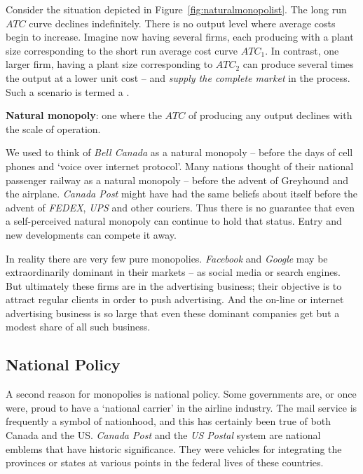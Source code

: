 Consider the situation depicted in Figure~\ref{fig:naturalmonopolist}. The long run $ATC$ curve declines indefinitely. There is no output level where average costs begin to increase. Imagine now having several firms, each producing with a plant size corresponding to the short run average cost curve $ATC_1$. In contrast, one larger firm, having a plant size corresponding to $ATC_2$ can produce several times the output at a lower unit cost -- and \textit{supply the complete market} in the process. Such a scenario is termed a .



\begin{DefBox}
\textbf{Natural monopoly}: one where the $ATC$ of producing any output declines with the scale of operation.
\end{DefBox}

We used to think of \textit{Bell Canada} as a natural monopoly -- before the days of cell phones and `voice over internet protocol'. Many nations thought of their national passenger railway as a natural monopoly -- before the advent of Greyhound and the airplane. \textit{Canada Post} might have had the same beliefs about itself before the advent of \textit{FEDEX}, \textit{UPS} and other couriers. Thus there is no guarantee that even a self-perceived natural monopoly can continue to hold that status. Entry and new developments can compete it away.

In reality there are very few pure monopolies. \textit{Facebook} and \textit{Google} may be extraordinarily dominant in their markets -- as social media or search engines. But ultimately these firms are in the advertising business; their objective is to attract regular clients in order to push advertising. And the on-line or internet advertising business is so large that even these dominant companies get but a modest share of all such business.

\subsection*{National Policy}

A second reason for monopolies is national policy. Some governments are, or once were, proud to have a `national carrier' in the airline industry. The mail service is frequently a symbol of nationhood, and this has certainly been true of both Canada and the US. \textit{Canada Post} and the \textit{US Postal} system are national emblems that have historic significance. They were vehicles for integrating the provinces or states at various points in the federal lives of these countries.

